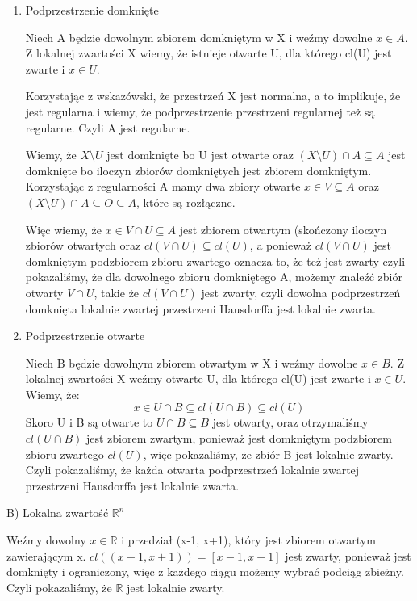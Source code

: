 \documentclass[12pt,a4paper]{article}
\def\R{\mathbb{R}}
\begin{document}
\begin{enumerate}
    \item Podprzestrzenie domknięte
    
    Niech A będzie dowolnym zbiorem domkniętym w X i weźmy dowolne $x \in A$. Z lokalnej zwartości X wiemy, że istnieje otwarte U, dla którego cl(U) jest zwarte i $x \in U$. 
    
    Korzystając z wskazówski, że przestrzeń X jest normalna, a to implikuje, że jest regularna i wiemy, że podprzestrzenie przestrzeni regularnej też są regularne. Czyli A jest regularne.
    
    Wiemy, że $X \setminus U$ jest domknięte bo U jest otwarte oraz $(X \setminus U) \cap A \subseteq A$ jest domknięte bo iloczyn zbiorów domkniętych jest zbiorem domkniętym. Korzystając z regularności A mamy dwa zbiory otwarte $x \in V \subseteq A$ oraz  $(X \setminus U) \cap A \subseteq O \subseteq A$, które są rozłączne.
    
    Więc wiemy, że $x \in V \cap U \subseteq A$ jest zbiorem otwartym (skończony iloczyn zbiorów otwartych oraz $cl(V \cap U) \subseteq cl(U)$, a ponieważ $cl(V \cap U)$ jest domkniętym podzbiorem zbioru zwartego oznacza to, że też jest zwarty czyli pokazaliśmy, że dla dowolnego zbioru domkniętego A, możemy znaleźć zbiór otwarty $V \cap U $, takie że $cl(V \cap U )$ jest zwarty, czyli dowolna podprzestrzeń domknięta lokalnie zwartej przestrzeni Hausdorffa jest lokalnie zwarta.
    
    \item Podprzestrzenie otwarte
    
    Niech B będzie dowolnym zbiorem otwartym w X i weźmy dowolne $x \in B$.
    Z lokalnej zwartości X weźmy otwarte U, dla którego cl(U) jest zwarte i $x \in U$. Wiemy, że:
    $$ x \in U \cap B \subseteq cl(U\cap B) \subseteq cl(U) $$
    Skoro U i B są otwarte to $U \cap B \subseteq B$ jest otwarty, oraz otrzymaliśmy $cl(U\cap B)$ jest zbiorem zwartym, ponieważ jest domkniętym podzbiorem zbioru zwartego $cl(U)$, więc pokazaliśmy, że zbiór B jest lokalnie zwarty. Czyli pokazaliśmy, że każda otwarta podprzestrzeń lokalnie zwartej przestrzeni Hausdorffa jest lokalnie zwarta.
\end{enumerate}

B) Lokalna zwartość $\R^n$

Weźmy dowolny $x \in \R$ i przedział (x-1, x+1), który jest zbiorem otwartym zawierającym x. $cl((x-1, x+1)) = [x-1, x+1]$ jest zwarty, ponieważ jest domknięty i ograniczony, więc z każdego ciągu możemy wybrać podciąg zbieżny. Czyli pokazaliśmy, że $\R$ jest lokalnie zwarty.
\end{document}
